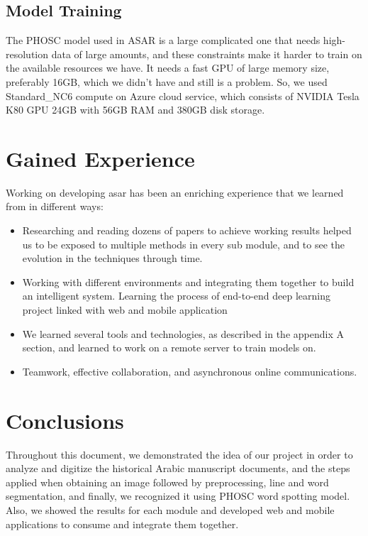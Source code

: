 \subsection{Model Training}
The PHOSC model used in ASAR is a large complicated one that needs high-resolution data of large amounts, and these constraints make it harder to train on the available resources we have. It needs a fast GPU of large memory size, preferably 16GB, which we didn't have and still is a problem. So, we used Standard\_NC6 compute on Azure cloud service, which consists of NVIDIA Tesla K80 GPU 24GB with 56GB RAM and 380GB disk storage.

\section{Gained Experience}

Working on developing \acrshort{asar} has been an enriching experience that we learned from in different ways:
\begin{itemize}[itemsep=1pt, topsep=5pt]
    \item Researching and reading dozens of papers to achieve working results helped us to be exposed to multiple methods in every sub module, and to see the evolution in the techniques through time.
    \item Working with different environments and integrating them together to build an intelligent system. Learning the process of end-to-end deep learning project linked with web and mobile application 
    \item We learned several tools and technologies, as described in the appendix A section, and learned to work on a remote server to train models on.
    \item Teamwork, effective collaboration, and asynchronous online communications.
\end{itemize}

\section{Conclusions}
Throughout this document, we demonstrated the idea of our project in order to analyze and digitize the historical Arabic manuscript documents, and the steps applied when obtaining an image followed by preprocessing, line and word segmentation, and finally, we recognized it using PHOSC word spotting model. Also, we showed the results for each module and developed web and mobile applications to consume and integrate them together. 

